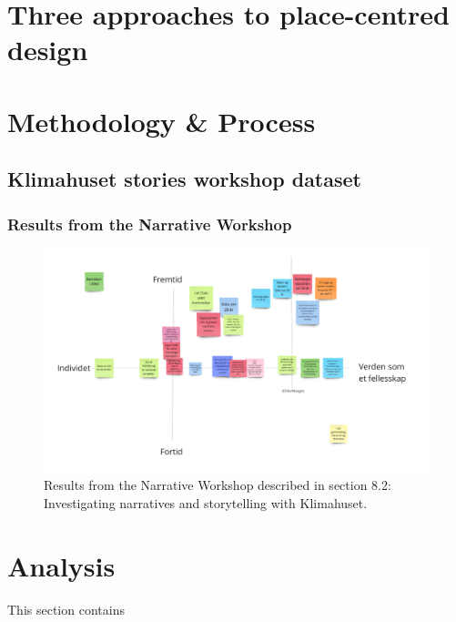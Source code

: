 \section{Three approaches to place-centred design}


\section{Methodology & Process}

\subsection{Klimahuset stories workshop dataset}

\subsubsection{Results from the Narrative Workshop}
\begin{figure}[H]
\includegraphics[width=12.5cm]{pictures/process/workshop_results.png}
\caption{Results from the Narrative Workshop described in section 8.2: Investigating narratives and storytelling with Klimahuset.}
\centering 
\end{figure}


\section{Analysis}
This section contains 

